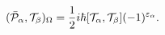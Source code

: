 \begin{equation}\label{5.7}
(\bar{\cal P}_\alpha,{\cal T}_\beta)_\Omega=\frac{1}{2}i\hbar
[{\cal T}_\alpha,{\cal T}_\beta](-1)^{\varepsilon_\alpha}.
\end{equation}

